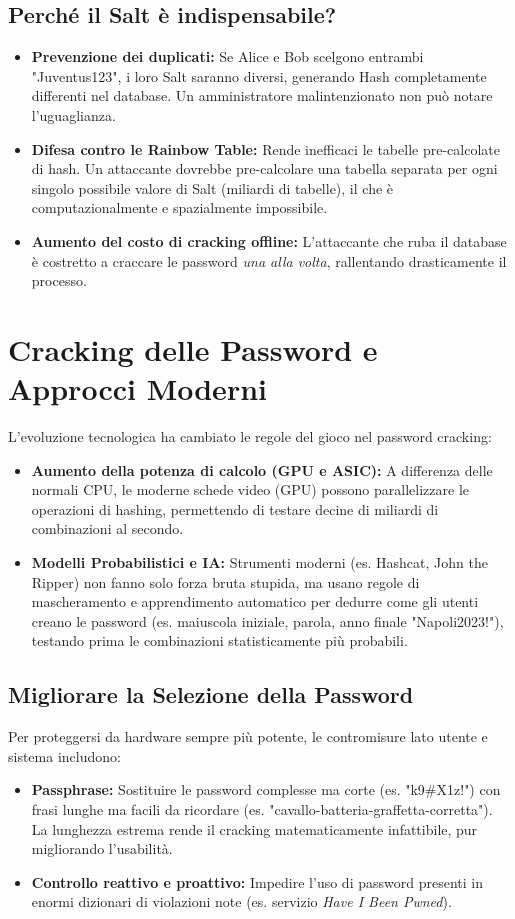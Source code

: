 \subsection{Perché il Salt è indispensabile?}
\begin{itemize}
    \item \textbf{Prevenzione dei duplicati:} Se Alice e Bob scelgono entrambi "Juventus123", i loro Salt saranno diversi, generando Hash completamente differenti nel database. Un amministratore malintenzionato non può notare l'uguaglianza.
    \item \textbf{Difesa contro le Rainbow Table:} Rende inefficaci le tabelle pre-calcolate di hash. Un attaccante dovrebbe pre-calcolare una tabella separata per ogni singolo possibile valore di Salt (miliardi di tabelle), il che è computazionalmente e spazialmente impossibile.
    \item \textbf{Aumento del costo di cracking offline:} L'attaccante che ruba il database è costretto a craccare le password \textit{una alla volta}, rallentando drasticamente il processo.
\end{itemize}

\section{Cracking delle Password e Approcci Moderni}

L'evoluzione tecnologica ha cambiato le regole del gioco nel password cracking:
\begin{itemize}
    \item \textbf{Aumento della potenza di calcolo (GPU e ASIC):} A differenza delle normali CPU, le moderne schede video (GPU) possono parallelizzare le operazioni di hashing, permettendo di testare decine di miliardi di combinazioni al secondo.
    \item \textbf{Modelli Probabilistici e IA:} Strumenti moderni (es. Hashcat, John the Ripper) non fanno solo forza bruta stupida, ma usano regole di mascheramento e apprendimento automatico per dedurre come gli utenti creano le password (es. maiuscola iniziale, parola, anno finale "Napoli2023!"), testando prima le combinazioni statisticamente più probabili.
\end{itemize}

\subsection{Migliorare la Selezione della Password}
Per proteggersi da hardware sempre più potente, le contromisure lato utente e sistema includono:
\begin{itemize}
    \item \textbf{Passphrase:} Sostituire le password complesse ma corte (es. "k9\#X1z!") con frasi lunghe ma facili da ricordare (es. "cavallo-batteria-graffetta-corretta"). La lunghezza estrema rende il cracking matematicamente infattibile, pur migliorando l'usabilità.
    \item \textbf{Controllo reattivo e proattivo:} Impedire l'uso di password presenti in enormi dizionari di violazioni note (es. servizio \textit{Have I Been Pwned}).
\end{itemize}

